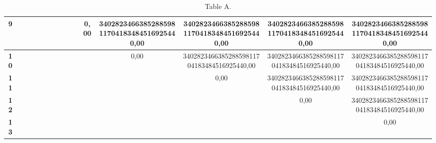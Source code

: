 \documentclass{article}
\begin{document}
\begin{table}[!ht]
\begin{adjustwidth}{-3cm}{-3cm}
\begin{tabular}{c||c|c|c|c|c|c|c|c|c|c|c|c|c|c|}
\multicolumn{1}{|c||}{\cellcolor{gray90}\textbf{9}} &  &  &  &  &  &  &  &  &  & 0,00 & 340282346638528859811704183484516925440,00 & 340282346638528859811704183484516925440,00 & 340282346638528859811704183484516925440,00 & 340282346638528859811704183484516925440,00 \\ \hline
\multicolumn{1}{|c||}{\cellcolor{gray90}\textbf{10}} &  &  &  &  &  &  &  &  &  &  & 0,00 & 340282346638528859811704183484516925440,00 & 340282346638528859811704183484516925440,00 & 340282346638528859811704183484516925440,00 \\ \hline
\multicolumn{1}{|c||}{\cellcolor{gray90}\textbf{11}} &  &  &  &  &  &  &  &  &  &  &  & 0,00 & 340282346638528859811704183484516925440,00 & 340282346638528859811704183484516925440,00 \\ \hline
\multicolumn{1}{|c||}{\cellcolor{gray90}\textbf{12}} &  &  &  &  &  &  &  &  &  &  &  &  & 0,00 & 340282346638528859811704183484516925440,00 \\ \hline
\multicolumn{1}{|c||}{\cellcolor{gray90}\textbf{13}} &  &  &  &  &  &  &  &  &  &  &  &  &  & 0,00 \\ \hline
\end{tabular}
\caption{Table A.}
\end{adjustwidth}
\end{table}
\end{document}
